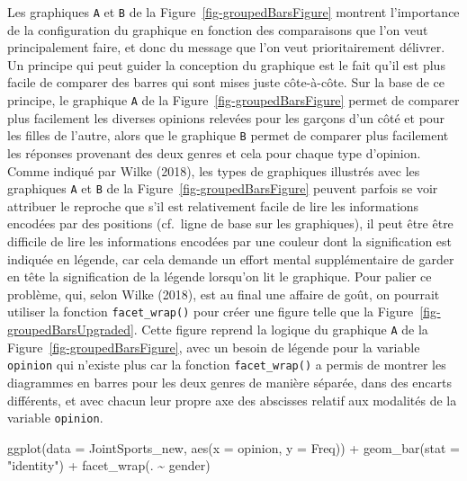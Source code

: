 \documentclass[
  letterpaper,
]{book}
\newenvironment{Shaded}{\begin{snugshade}}{\end{snugshade}}
\newcommand{\AttributeTok}[1]{\textcolor[rgb]{0.40,0.45,0.13}{#1}}
\newcommand{\FunctionTok}[1]{\textcolor[rgb]{0.28,0.35,0.67}{#1}}
\newcommand{\NormalTok}[1]{\textcolor[rgb]{0.00,0.23,0.31}{#1}}
\newcommand{\SpecialCharTok}[1]{\textcolor[rgb]{0.37,0.37,0.37}{#1}}
\newcommand{\StringTok}[1]{\textcolor[rgb]{0.13,0.47,0.30}{#1}}
\begin{document}
Les graphiques \texttt{A} et \texttt{B} de la
Figure~\ref{fig-groupedBarsFigure} montrent l'importance de la
configuration du graphique en fonction des comparaisons que l'on veut
principalement faire, et donc du message que l'on veut prioritairement
délivrer. Un principe qui peut guider la conception du graphique est le
fait qu'il est plus facile de comparer des barres qui sont mises juste
côte-à-côte. Sur la base de ce principe, le graphique \texttt{A} de la
Figure~\ref{fig-groupedBarsFigure} permet de comparer plus facilement
les diverses opinions relevées pour les garçons d'un côté et pour les
filles de l'autre, alors que le graphique \texttt{B} permet de comparer
plus facilement les réponses provenant des deux genres et cela pour
chaque type d'opinion. Comme indiqué par Wilke (2018), les types de
graphiques illustrés avec les graphiques \texttt{A} et \texttt{B} de la
Figure~\ref{fig-groupedBarsFigure} peuvent parfois se voir attribuer le
reproche que s'il est relativement facile de lire les informations
encodées par des positions (cf.~ligne de base sur les graphiques), il
peut être être difficile de lire les informations encodées par une
couleur dont la signification est indiquée en légende, car cela demande
un effort mental supplémentaire de garder en tête la signification de la
légende lorsqu'on lit le graphique. Pour palier ce problème, qui, selon
Wilke (2018), est au final une affaire de goût, on pourrait utiliser la
fonction \texttt{facet\_wrap()} pour créer une figure telle que la
Figure~\ref{fig-groupedBarsUpgraded}. Cette figure reprend la logique du
graphique \texttt{A} de la Figure~\ref{fig-groupedBarsFigure}, avec un
besoin de légende pour la variable \texttt{opinion} qui n'existe plus
car la fonction \texttt{facet\_wrap()} a permis de montrer les
diagrammes en barres pour les deux genres de manière séparée, dans des
encarts différents, et avec chacun leur propre axe des abscisses relatif
aux modalités de la variable \texttt{opinion}.

\begin{Shaded}
\begin{Highlighting}[]
\FunctionTok{ggplot}\NormalTok{(}\AttributeTok{data =}\NormalTok{ JointSports\_new, }\FunctionTok{aes}\NormalTok{(}\AttributeTok{x =}\NormalTok{ opinion, }\AttributeTok{y =}\NormalTok{ Freq)) }\SpecialCharTok{+}
  \FunctionTok{geom\_bar}\NormalTok{(}\AttributeTok{stat =} \StringTok{"identity"}\NormalTok{) }\SpecialCharTok{+}
  \FunctionTok{facet\_wrap}\NormalTok{(. }\SpecialCharTok{\textasciitilde{}}\NormalTok{ gender)}
\end{Highlighting}
\end{Shaded}
\end{document}
